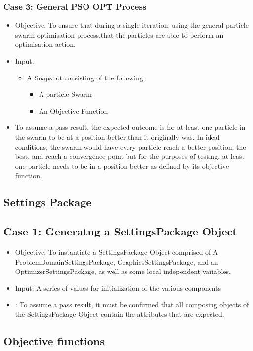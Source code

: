 \documentclass[11pt]{article}
\begin{document}
\subsubsection{Case 3: General PSO OPT Process}
\begin{itemize}
    \item Objective: To ensure that during a single iteration, using the general particle swarm optimisation process,that the particles are able to perform an optimisation action.
    \item Input: \begin{itemize}
    \item A Snapshot consisting of the following:
    	\begin{itemize}
    	\item A particle Swarm
    	\item An Objective Function
    	\end{itemize}
    \end{itemize}
    \item To assume a pass result, the expected outcome is for at least one particle in the swarm to be at a position better than it originally was. In ideal conditions, the swarm would have every particle reach a better position, the best, and reach a convergence point but for the purposes of testing, at least one particle needs to be in a position better as defined by its objective function.
\end{itemize}
\subsection{Settings Package}
\subsection{Case 1: Generatng a SettingsPackage Object}
\begin{itemize}
    \item Objective: To instantiate a SettingsPackage Object comprised of A ProblemDomainSettingsPackage, GraphicsSettingsPackage, and an OptimizerSettingsPackage, as well as some local independent variables.
    \item Input: A series of values for initialization of the various components
    \item: To assume a pass result, it must be confirmed that all composing objects of the SettingsPackage Object contain the attributes that are expected.
    \end{itemize}
\subsection{Objective functions}
\end{document}
